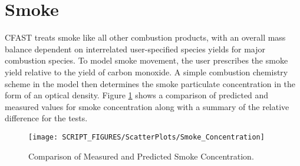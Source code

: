 \section{Smoke}

CFAST treats smoke like all other combustion products, with an overall mass balance dependent on interrelated user-specified species yields for major combustion species.  To model smoke movement, the user prescribes the smoke yield relative to the yield of carbon monoxide.  A simple combustion chemistry scheme in the model then determines the smoke particulate concentration in the form of an optical density.  Figure \ref{fig:Smoke_Scatter} shows a comparison of predicted and measured values for smoke concentration along with a summary of the relative difference for the tests.
\label{Smoke Concentration}

\begin{figure}
\begin{center}
\texttt{[image: SCRIPT\_FIGURES/ScatterPlots/Smoke\_Concentration]}
\end{center}
\caption{Comparison of Measured and Predicted Smoke Concentration.} \label{fig:Smoke_Scatter}
\end{figure}
